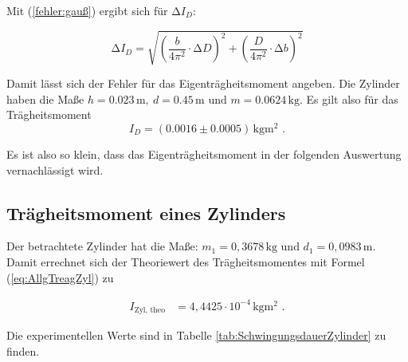 Mit (\ref{fehler:gauß}) ergibt sich  für $\increment I_{D}$:

\begin{equation*}
  \increment I_{D} = \sqrt{\left(\frac{b}{4 \pi^2} \cdot  \increment D\right)^2 + \left(\frac{D}{4 \pi^2} \cdot  \increment b\right)^2}
\end{equation*}


Damit lässt sich der Fehler für das Eigenträgheitsmoment angeben.
Die Zylinder haben die Maße $h = 0.023 \, \unit{\meter}, \: d = 0.45 \, \unit{\meter} \text{ und } m = 0.0624 \, \unit{\kilo\gram}$.
Es gilt also für das Trägheitsmoment
\begin{equation*}
  I_{D} =  (0.0016 \pm 0.0005) \, \unit{\kilo\gram\meter\squared} \text{ .}
\end{equation*}

Es ist also so klein, dass das Eigenträgheitsmoment in der folgenden Auswertung vernachlässigt wird.


\subsection{Trägheitsmoment eines Zylinders}
\label{sec:TraegZylinder}

Der betrachtete Zylinder hat die Maße: $m_1 = 0,3678 \, \unit{\kilo\gram}$ und $d_1 = 0,0983 \, \unit{\meter}$.
Damit errechnet sich der Theoriewert des Trägheitsmomentes mit Formel (\ref{eq:AllgTreagZyl}) zu

\begin{align*}
  I_{\text{Zyl, theo}} &= 4,4425 \cdot 10^{-4} \, \unit{\kilo\gram\meter\squared} \text{ .}
\end{align*}

Die experimentellen Werte sind in Tabelle \ref{tab:SchwingungsdauerZylinder} zu finden.

